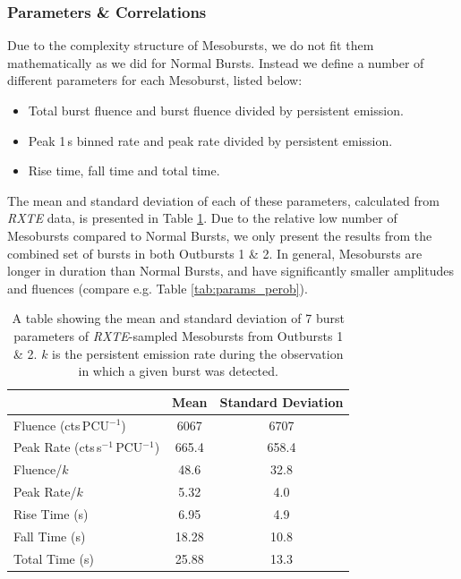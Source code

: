 \subsubsection{Parameters \& Correlations}

\label{sec:mesostruc}

\par Due to the complexity structure of Mesobursts, we do not fit them mathematically as we did for Normal Bursts.  Instead we define a number of different parameters for each Mesoburst, listed below:
\begin{itemize}
\item Total burst fluence and burst fluence divided by persistent emission.
\item Peak 1\,s binned rate and peak rate divided by persistent emission.
\item Rise time, fall time and total time.
\end{itemize}
\par The mean and standard deviation of each of these parameters, calculated from \textit{RXTE} data, is presented in Table \ref{tab:meso_param}.  Due to the relative low number of Mesobursts compared to Normal Bursts, we only present the results from the combined set of bursts in both Outbursts 1 \& 2.  In general, Mesobursts are longer in duration than Normal Bursts, and have significantly smaller amplitudes and fluences (compare e.g. Table \ref{tab:params_perob}).

\begin{table}
\centering
\begin{tabular}{l c c}
\hline
\hline
&Mean&Standard Deviation\\
\hline
Fluence \scriptsize(cts\,PCU$^{-1}$)&6067&6707\\
Peak Rate \scriptsize(cts\,s$^{-1}$\,PCU$^{-1}$)&665.4&658.4\\
Fluence/$k$&48.6&32.8\\
Peak Rate/$k$&5.32&4.0\\
Rise Time \scriptsize(s)&6.95&4.9\\
Fall Time \scriptsize(s)&18.28&10.8\\
Total Time \scriptsize(s)&25.88&13.3\\
\hline
\hline
\end{tabular}
\caption{A table showing the mean and standard deviation of 7 burst parameters of \textit{RXTE}-sampled Mesobursts from Outbursts 1 \& 2.  $k$ is the persistent emission rate during the observation in which a given burst was detected.}
\label{tab:meso_param}
\end{table}

